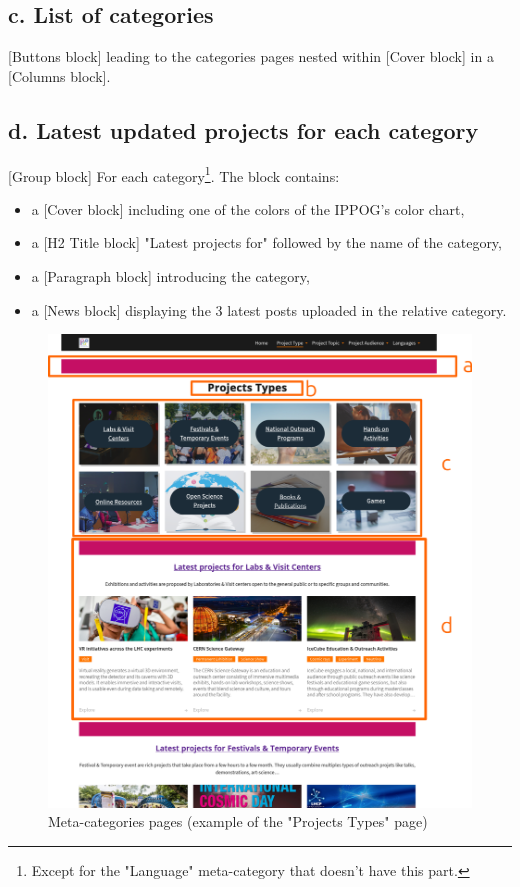 \subsection*{c. List of categories}
[Buttons block] leading to the categories pages nested within [Cover block] in a [Columns block].

\subsection*{d. Latest updated projects for each category}
[Group block] For each category\footnote{Except for the "Language" meta-category that doesn't have this part.}. The block contains: 
\begin{itemize}
    \item a [Cover block] including one of the colors of the IPPOG's color chart,
    \item a [H2 Title block] "Latest projects for" followed by the name of the category,
    \item a [Paragraph block] introducing the category,
    \item a [News block] displaying the 3 latest posts uploaded in the relative category.
\end{itemize}

\begin{figure}[p]
    \centering
    \includegraphics[width=\linewidth]{Image/Architecture/structure_types.png}
    \caption{Meta-categories pages (example of the "Projects Types" page)}
    \label{fig:structure_metacategory}
\end{figure}

